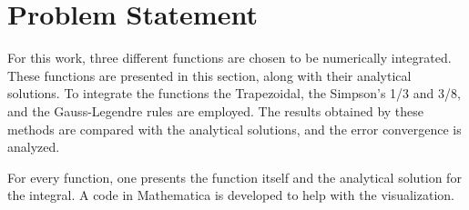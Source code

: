 \section{Problem Statement}\label{sec:problem-presentation}
For this work, three different functions are chosen to be numerically integrated. These functions are presented in this section, along with their analytical solutions. To integrate the functions the Trapezoidal, the Simpson's 1/3 and 3/8, and the Gauss-Legendre rules are employed. The results obtained by these methods are compared with the analytical solutions, and the error convergence is analyzed.

For every function, one presents the function itself and the analytical solution for the integral. A code in Mathematica is developed to help with the visualization.


